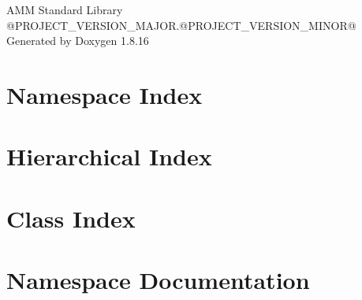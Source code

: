 \let\mypdfximage\pdfximage\def\pdfximage{\immediate\mypdfximage}\documentclass[twoside]{book}
\newcommand{\+}{\discretionary{\mbox{\scriptsize$\hookleftarrow$}}{}{}}
\newcommand{\clearemptydoublepage}{%
  \newpage{\pagestyle{empty}\cleardoublepage}%
}
\begin{document}
\hypersetup{pageanchor=false,
             bookmarksnumbered=true,
             pdfencoding=unicode
            }
\begin{titlepage}
\vspace*{7cm}
\begin{center}%
{\Large A\+MM Standard Library \\[1ex]\large @\+P\+R\+O\+J\+E\+C\+T\+\_\+\+V\+E\+R\+S\+I\+O\+N\+\_\+\+M\+A\+J\+OR.@\+P\+R\+O\+J\+E\+C\+T\+\_\+\+V\+E\+R\+S\+I\+O\+N\+\_\+\+M\+I\+N\+OR@ }\\
\vspace*{1cm}
{\large Generated by Doxygen 1.8.16}\\
\end{center}
\end{titlepage}
\clearemptydoublepage
{}
\tableofcontents
\clearemptydoublepage
{}
\hypersetup{pageanchor=true}

\chapter{Namespace Index}

\chapter{Hierarchical Index}

\chapter{Class Index}

\chapter{Namespace Documentation}



\end{document}
